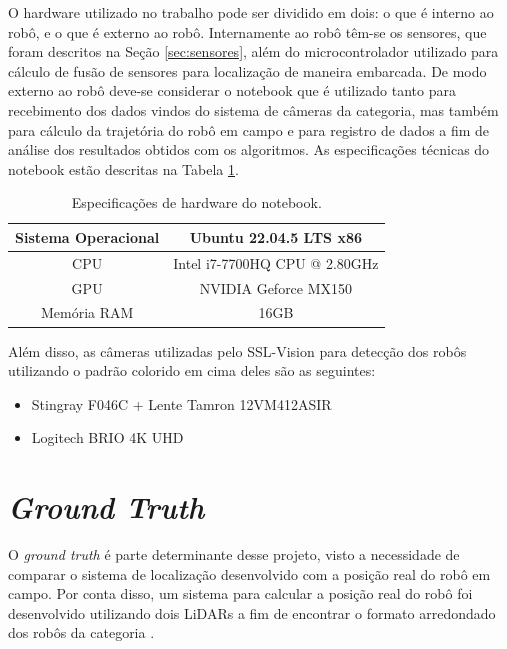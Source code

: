 \documentclass[acronym, symbols, table]{fei}
\begin{document}
		O hardware utilizado no trabalho pode ser dividido em dois: o que é interno ao robô, e o que é externo ao robô. Internamente ao robô têm-se os sensores, que foram descritos na Seção \ref{sec:sensores}, além do microcontrolador utilizado para cálculo de fusão de sensores para localização de maneira embarcada. De modo externo ao robô deve-se considerar o notebook que é utilizado tanto para recebimento dos dados vindos do sistema de câmeras da categoria, mas também para cálculo da trajetória do robô em campo e para registro de dados a fim de análise dos resultados obtidos com os algoritmos. As especificações técnicas do notebook estão descritas na Tabela \ref{tbl:especificacoes_notebook}.
		
		\begin{table}[!htb]
			\centering
			\caption{Especificações de hardware do notebook.}
			\label{tbl:especificacoes_notebook}
			\begin{tabular}{c c}
				\hline
				Sistema Operacional & Ubuntu 22.04.5 LTS x86\textunderscore64  \\ \hline
				CPU 				& Intel i7-7700HQ CPU @ 2.80GHz \\ \hline
				GPU 				& NVIDIA Geforce MX150 \\ \hline
				Memória RAM			& 16GB \\ \hline
			\end{tabular}
		\end{table}
	
		Além disso, as câmeras utilizadas pelo SSL-Vision para detecção dos robôs utilizando o padrão colorido em cima deles são as seguintes:
		
		\begin{itemize}
			\item Stingray F046C \cite{stingray_f046c} + Lente Tamron 12VM412ASIR
			\item Logitech BRIO 4K UHD \cite{logitech_brio}
		\end{itemize}
	
	\section{\textit{Ground Truth}}\label{sec:metodologia_ground_truth}
	
	O \textit{ground truth} é parte determinante desse projeto, visto a necessidade de comparar o sistema de localização desenvolvido com a posição real do robô em campo. Por conta disso, um sistema para calcular a posição real do robô foi desenvolvido utilizando dois LiDARs a fim de encontrar o formato arredondado dos robôs da categoria .
	
\end{document}
